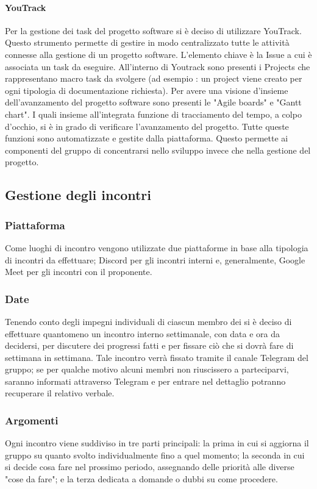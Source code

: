 \paragraph{YouTrack}
Per la gestione dei task del progetto software si è deciso di utilizzare YouTrack\glo{}.
Questo strumento permette di gestire in modo centralizzato tutte le attività connesse alla
gestione di un progetto software. L'elemento chiave è la Issue\glo{} a cui è associata un task da eseguire.
All'interno di Youtrack sono presenti i Projects che rappresentano macro task da svolgere (ad esempio : un project viene creato per ogni tipologia di documentazione richiesta).
Per avere una visione d'insieme dell'avanzamento del progetto software sono presenti le "Agile boards\glo{}" e "Gantt chart\glo{}". I quali insieme all'integrata funzione di tracciamento del tempo, a colpo d'occhio, si è in grado di verificare l'avanzamento del progetto.
Tutte queste funzioni sono automatizzate e gestite dalla piattaforma. Questo permette ai componenti del gruppo di concentrarsi nello sviluppo invece che nella gestione del progetto.

\subsection{Gestione degli incontri}
\subsubsection{Piattaforma}
Come luoghi di incontro vengono utilizzate due piattaforme in base alla tipologia di incontri da effettuare; Discord\glo{} per gli incontri interni e, generalmente, Google Meet\glo{} per gli incontri con il proponente.

\subsubsection{Date}
Tenendo conto degli impegni individuali di ciascun membro dei \groupName{} si è deciso di effettuare quantomeno un incontro interno settimanale, con data e ora da decidersi, per discutere dei progressi fatti e per fissare ciò che si dovrà fare di settimana in settimana. Tale incontro verrà fissato tramite il canale Telegram\glo{} del gruppo; se per qualche motivo alcuni membri non riuscissero a parteciparvi, saranno informati attraverso Telegram e per entrare nel dettaglio potranno recuperare il relativo verbale.

\subsubsection{Argomenti}
Ogni incontro viene suddiviso in tre parti principali: la prima in cui si aggiorna il gruppo su quanto svolto individualmente fino a quel momento; la seconda in cui si decide cosa fare nel prossimo periodo, assegnando delle priorità alle diverse "cose da fare"; e la terza dedicata a domande o dubbi su come procedere.